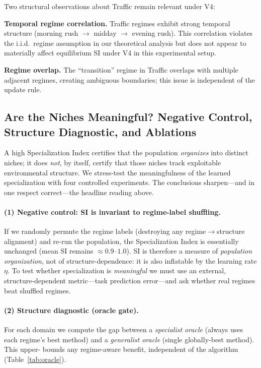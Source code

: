 \documentclass{article}
\begin{document}
Two structural observations about Traffic remain relevant under V4:

\textbf{Temporal regime correlation.} Traffic regimes exhibit strong
temporal structure (morning rush $\to$ midday $\to$ evening rush). This
correlation violates the i.i.d.\ regime assumption in our theoretical
analysis but does not appear to materially affect equilibrium SI under
V4 in this experimental setup.

\textbf{Regime overlap.} The ``transition'' regime in Traffic overlaps
with multiple adjacent regimes, creating ambiguous boundaries; this
issue is independent of the update rule.

\subsection{Are the Niches Meaningful? Negative Control, Structure Diagnostic, and Ablations}
\label{sec:meaningfulness}

A high Specialization Index certifies that the population \emph{organizes}
into distinct niches; it does \emph{not}, by itself, certify that those niches
track exploitable environmental structure. We stress-test the meaningfulness of
the learned specialization with four controlled experiments. The conclusions
sharpen---and in one respect correct---the headline reading above.

\paragraph{(1) Negative control: SI is invariant to regime-label shuffling.}
If we randomly permute the regime labels (destroying any regime$\to$structure
alignment) and re-run the population, the Specialization Index is essentially
unchanged (mean SI remains $\approx 0.9$--$1.0$). SI is therefore a measure of
\emph{population organization}, not of structure-dependence: it is also
inflatable by the learning rate $\eta$. To test whether specialization is
\emph{meaningful} we must use an external, structure-dependent metric---task
prediction error---and ask whether real regimes beat shuffled regimes.

\paragraph{(2) Structure diagnostic (oracle gate).} For each domain we compute
the gap between a \emph{specialist oracle} (always uses each regime's best
method) and a \emph{generalist oracle} (single globally-best method). This upper-
bounds any regime-aware benefit, independent of the algorithm
(Table~\ref{tab:oracle}).
\end{document}
